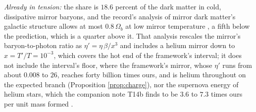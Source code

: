 \documentclass[11pt]{article}
\theoremstyle{definition}
\begin{document}
\begin{enumerate}
\emph{Already in tension:} the share is $18.6$ percent of the dark matter in cold, dissipative mirror baryons, and the record's analysis of mirror dark matter's galactic structure allows at most $0.8\,\Omega_{b}$ at low mirror temperature \cite{RouxCline2020}, a fifth below the prediction, which is a quarter above it. That analysis rescales the mirror's baryon-to-photon ratio as $\eta' = \eta\,\beta/x^{3}$ and includes a helium mirror down to $x = T'/T = 10^{-3}$, which covers the hot end of the framework's interval; it does not include the interval's floor, where the framework's mirror, whose $\eta'$ runs from about $0.008$ to $26$, reaches forty billion times ours, and is helium throughout on the expected branch (Proposition \ref{prop:charge}), nor the supernova energy of helium stars, which the companion note T14b finds to be $3.6$ to $7.3$ times ours per unit mass formed \cite{ButlerT14b}.


\end{enumerate}
\end{document}
